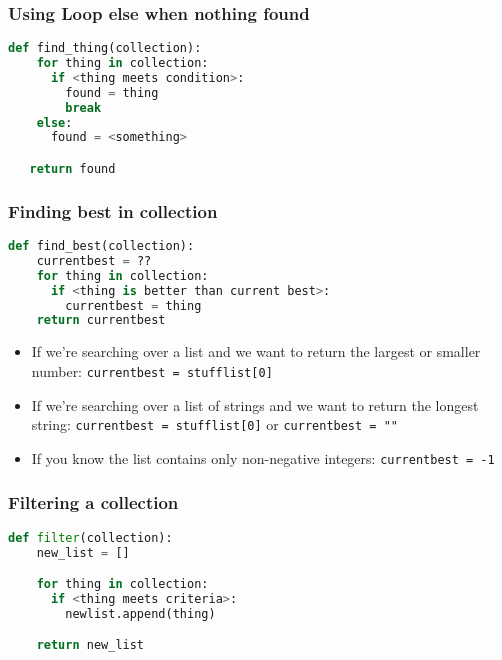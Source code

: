 \documentclass{beamer}
\begin{document}
%
%
\begin{frame}[fragile]
  \frametitle{Using Loop else when nothing found}
  \begin{lstlisting}[language=Python, autogobble]
  def find_thing(collection):
    for thing in collection:
      if <thing meets condition>:
        found = thing
        break
    else:
      found = <something>

   return found
  \end{lstlisting}
\end{frame}

%
%
\begin{frame}[fragile]
  \frametitle{Finding best in collection}
  \begin{lstlisting}[language=Python, autogobble]
  def find_best(collection):
    currentbest = ??
    for thing in collection:
      if <thing is better than current best>:
        currentbest = thing
    return currentbest 
  \end{lstlisting}
  \vfill
  \begin{itemize}
    \item If we're searching over a list and we want to return the largest or smaller number: \lstinline|currentbest = stufflist[0]| \pause
    \item If we're searching over a list of strings and we want to return the longest string: \lstinline|currentbest = stufflist[0]| or \lstinline|currentbest = ""| \pause
    \item If you know the list contains only non-negative integers: \lstinline|currentbest = -1|
  \end{itemize}
\end{frame}

%
%
\begin{frame}[fragile]
  \frametitle{Filtering a collection}
  \begin{lstlisting}[language=Python, autogobble]
  def filter(collection):
    new_list = []

    for thing in collection:
      if <thing meets criteria>:
        newlist.append(thing)

    return new_list
  \end{lstlisting}
\end{frame}
\end{document}
